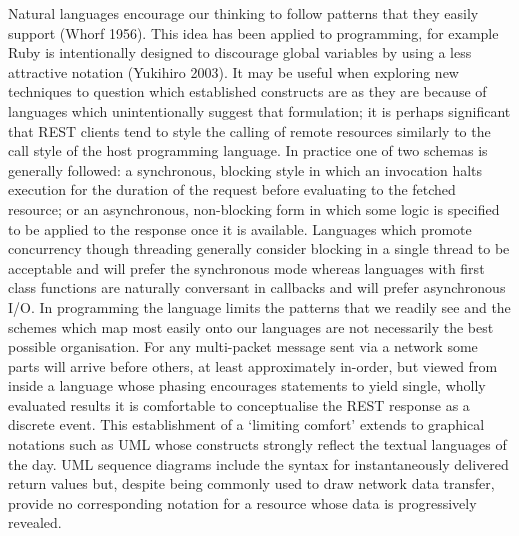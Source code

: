 \documentclass[12pt, ]{article}
\begin{document}
Natural languages encourage our thinking to follow patterns that they
easily support (Whorf 1956). This idea has been applied to programming,
for example Ruby is intentionally designed to discourage global
variables by using a less attractive notation (Yukihiro 2003). It may be
useful when exploring new techniques to question which established
constructs are as they are because of languages which unintentionally
suggest that formulation; it is perhaps significant that REST clients
tend to style the calling of remote resources similarly to the call
style of the host programming language. In practice one of two schemas
is generally followed: a synchronous, blocking style in which an
invocation halts execution for the duration of the request before
evaluating to the fetched resource; or an asynchronous, non-blocking
form in which some logic is specified to be applied to the response once
it is available. Languages which promote concurrency though threading
generally consider blocking in a single thread to be acceptable and will
prefer the synchronous mode whereas languages with first class functions
are naturally conversant in callbacks and will prefer asynchronous I/O.
In programming the language limits the patterns that we readily see and
the schemes which map most easily onto our languages are not necessarily
the best possible organisation. For any multi-packet message sent via a
network some parts will arrive before others, at least approximately
in-order, but viewed from inside a language whose phasing encourages
statements to yield single, wholly evaluated results it is comfortable
to conceptualise the REST response as a discrete event. This
establishment of a `limiting comfort' extends to graphical notations
such as UML whose constructs strongly reflect the textual languages of
the day. UML sequence diagrams include the syntax for instantaneously
delivered return values but, despite being commonly used to draw network
data transfer, provide no corresponding notation for a resource whose
data is progressively revealed.
\end{document}
